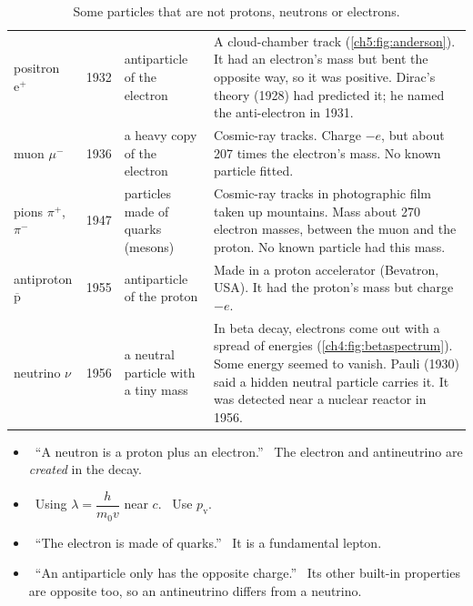 \begin{table}
  \caption{Some particles that are not protons, neutrons or electrons.}\label{ch5:tab:particles}
  \centering
  \small
  \begin{tabular}{@{}L{22mm}L{10mm}L{29mm}L{77mm}@{}}
    \toprule
     &  &  &
      \\
    \midrule
    positron $\mathrm{e}^+$ & 1932 & antiparticle of the electron & A cloud-chamber
      track (\cref{ch5:fig:anderson}). It had an electron's mass but bent the opposite
      way, so it was positive. Dirac's theory (1928) had predicted it; he named the
      anti-electron in 1931.\\
    muon $\mu^-$ & 1936 & a heavy copy of the electron & Cosmic-ray tracks. Charge $-e$,
      but about 207 times the electron's mass. No known particle fitted.\\
    pions $\pi^+$, $\pi^-$ & 1947 & particles made of quarks (mesons) & Cosmic-ray
      tracks in photographic film taken up mountains. Mass about 270 electron masses, between the
      muon and the proton. No known particle had this mass.\\
    antiproton $\overline{\mathrm{p}}$ & 1955 & antiparticle of the proton & Made in a
      proton accelerator (Bevatron, USA). It had the proton's mass but charge $-e$.\\
    neutrino $\nu$ & 1956 & a neutral particle with a tiny mass & In beta decay, electrons
      come out with a spread of energies (\cref{ch4:fig:betaspectrum}). Some energy seemed
      to vanish. Pauli (1930) said a hidden neutral particle carries it. It was detected
      near a nuclear reactor in 1956.\\
    \bottomrule
  \end{tabular}
\end{table}

\begin{mistakes}
\begin{itemize}
  \item \xmark\ ``A neutron is a proton plus an electron.'' \cmark\ The electron and
        antineutrino are \emph{created} in the decay.
  \item \xmark\ Using $\lambda = \dfrac{h}{m_0 v}$ near $c$. \cmark\ Use $p_\mathrm{v}$.
  \item \xmark\ ``The electron is made of quarks.'' \cmark\ It is a fundamental lepton.
  \item \xmark\ ``An antiparticle only has the opposite charge.'' \cmark\ Its other
        built-in properties are opposite too, so an antineutrino differs from a neutrino.
\end{itemize}
\end{mistakes}

